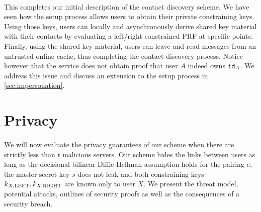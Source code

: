 	
	\paragraph{} This completes our initial description of the contact discovery scheme. We have seen how the setup process allows users to obtain their private constraining keys. Using those keys, users can locally and asynchronously derive shared key material with their contacts by evaluating a left/right constrained PRF at specific points. Finally, using the shared key material, users can leave and read messages from an untrusted online cache, thus completing the contact discovery process. Notice however that the service does not obtain proof that user $A$ indeed owns $\mathtt{id}_A$. We address this issue and discuss an extension to the setup process in \autoref{sec:impersonation}.

		


\section{Privacy}
\label{sec:security}



\paragraph{} We will now evaluate the privacy guarantees of our scheme when there are strictly less than $t$ malicious servers. Our scheme hides the links between users as long as the decisional bilinear Diffie-Hellman assumption holds for the pairing $e$, the master secret key $s$ does not leak and both constraining keys $k_{X,\mathrm{LEFT}}, k_{X,\mathrm{RIGHT}}$ are known only to user $X$. We present the threat model, potential attacks, outlines of security proofs as well as the consequences of a security breach.



